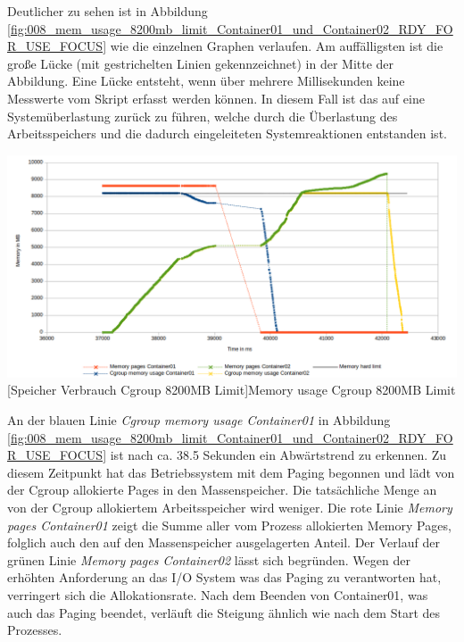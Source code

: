 Deutlicher zu sehen ist in Abbildung \ref{fig:008_mem_usage_8200mb_limit_Container01_und_Container02_RDY_FOR_USE_FOCUS} wie die einzelnen Graphen verlaufen. Am auffälligsten ist die große Lücke (mit gestrichelten Linien gekennzeichnet) in der Mitte der Abbildung. Eine Lücke entsteht, wenn über mehrere Millisekunden keine Messwerte vom Skript erfasst werden können. In diesem Fall ist das auf eine Systemüberlastung zurück zu führen, welche durch die Überlastung des Arbeitsspeichers und die dadurch eingeleiteten Systemreaktionen entstanden ist. 

\vspace{1em}
\begin{minipage}{\linewidth}
	\centering
	\includegraphics[width=1\linewidth]{pics/008_mem_usage_8200mb_limit_Container01_und_Container02_RDY_FOR_USE_FOCUS.png}
	[Speicher Verbrauch Cgroup 8200MB Limit]{Memory usage Cgroup 8200MB Limit}
	\label{fig:008_mem_usage_8200mb_limit_Container01_und_Container02_RDY_FOR_USE_FOCUS}
\end{minipage}



An der blauen Linie \emph{Cgroup memory usage Container01} in Abbildung \ref{fig:008_mem_usage_8200mb_limit_Container01_und_Container02_RDY_FOR_USE_FOCUS} ist nach ca. 38.5 Sekunden ein Abwärtstrend zu erkennen. Zu diesem Zeitpunkt hat das Betriebssystem mit dem Paging begonnen und lädt von der Cgroup allokierte Pages in den Massenspeicher. Die tatsächliche Menge an von der Cgroup allokiertem Arbeitsspeicher wird weniger. Die rote Linie \emph{Memory pages Container01} zeigt die Summe aller vom Prozess allokierten Memory Pages, folglich auch den auf den Massenspeicher ausgelagerten Anteil. Der Verlauf der grünen Linie \emph{Memory pages Container02} lässt sich begründen. Wegen der erhöhten Anforderung an das I/O System was das Paging zu verantworten hat, verringert sich die Allokationsrate. Nach dem Beenden von Container01, was auch das Paging beendet, verläuft die Steigung ähnlich wie nach dem Start des Prozesses. 


